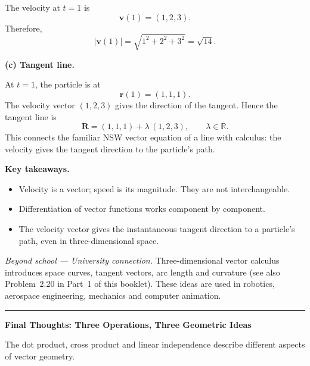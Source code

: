 The velocity at $t = 1$ is
\[
  \mathbf{v}(1) = (1, 2, 3).
\]
Therefore,
\[
  |\mathbf{v}(1)|
  = \sqrt{1^{2} + 2^{2} + 3^{2}}
  = \boxed{\sqrt{14}}.
\]

\vspace{0.3em}
\noindent\textbf{(c) Tangent line.}

At $t = 1$, the particle is at
\[
  \mathbf{r}(1) = (1, 1, 1).
\]
The velocity vector $(1, 2, 3)$ gives the direction of the tangent.
Hence the tangent line is
\[
  \boxed{
  \mathbf{R} = (1, 1, 1) + \lambda\,(1, 2, 3),
  \qquad \lambda \in \mathbb{R}
  }.
\]
This connects the familiar NSW vector equation of a line with
calculus: the velocity gives the tangent direction to the particle's
path.

\vspace{0.8em}
\noindent\textbf{Key takeaways.}
\begin{itemize}[leftmargin=*,itemsep=2pt]
  \item Velocity is a vector; speed is its magnitude.
        They are not interchangeable.
  \item Differentiation of vector functions works component by
        component.
  \item The velocity vector gives the instantaneous tangent direction
        to a particle's path, even in three-dimensional space.
\end{itemize}

\vspace{0.4em}
\noindent\textit{Beyond school --- University connection.}
Three-dimensional vector calculus introduces space curves, tangent
vectors, arc length and curvature
(see also Problem~2.20 in Part~1 of this booklet).
These ideas are used in robotics, aerospace engineering, mechanics
and computer animation.

\vspace{1.2em}
\noindent\rule{\textwidth}{0.5pt}
\vspace{0.4em}

\noindent\textbf{\large Final Thoughts: Three Operations,
Three Geometric Ideas}

\vspace{0.4em}
\noindent
The dot product, cross product and linear independence describe
different aspects of vector geometry.

